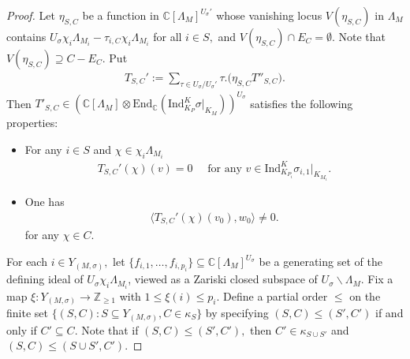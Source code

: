 \documentclass[10pt]{amsart}
\theoremstyle{definition}
\numberwithin{equation}{section}
\numberwithin{equation}{subsection}
\newcommand{\Ind}{\mathrm{Ind}}
\newcommand{\ZZ}{\mathbb{Z}}
\newcommand{\CC}{\mathbb{C}}
\begin{document}
\begin{proof}
Let $\eta_{S,C}$ be a function in $\CC[\Lambda_M]^{U_\sigma'}$ whose vanishing locus $V(\eta_{S,C})$ in $\Lambda_M$ contains $U_\sigma \chi_i\Lambda_{M_i}-\tau_{i,C}\chi_i\Lambda_{M_i}$ for all $i\in S,$ and $V(\eta_{S,C})\cap E_C=\emptyset.$ Note that $V(\eta_{S,C})\supseteq C-E_C.$ Put
\begin{align*}
    T_{S,C}':=\sum_{\tau\in U_\sigma/U_{\sigma}'} \tau. \bigg(\eta_{S,C} T''_{S,C}\bigg).
\end{align*}
Then $T'_{S,C}\in \left(\CC[\Lambda_M]\otimes \mathrm{End}_\CC (\Ind_{K_P}^K \sigma|_{K_M})\right)^{U_\sigma}$ satisfies the following properties: 
\begin{itemize}
    \item For any $i\in S$ and $\chi\in \chi_i\Lambda_{M_i}$
\begin{align*}
    T_{S,C}'(\chi)(v)=0\quad\textrm{ for any } v\in \mathrm{Ind}_{K_{P_i}}^{K} \sigma_{i,1}|_{K_{M_i}}.
\end{align*}
    \item One has 
    \begin{align*}
        \langle T_{S,C}'(\chi)(v_0),w_0\rangle\neq 0.
    \end{align*}
    for any $\chi\in C$.
\end{itemize}


 

For each $i\in Y_{(M,\sigma)},$ let $\{f_{i,1},\ldots,f_{i,p_i}\}\subseteq\CC[\Lambda_M]^{U_\sigma}$ be a generating set of the defining ideal of $U_\sigma\chi_i\Lambda_{M_i}$, viewed as a Zariski closed subspace of $U_\sigma\backslash \Lambda_M$. Fix a map $\xi:Y_{(M,\sigma)}\to \ZZ_{\geq 1}$ with $1\leq \xi(i)\leq p_i$. Define a partial order $\le$ on the finite set $\{(S,C): S\subseteq Y_{(M,\sigma)}, C\in \kappa_S\}$ by specifying $(S,C)\le (S',C')$ if and only if $C'\subseteq C$. Note that if $(S,C)\le (S',C'),$ then $C'\in \kappa_{S\cup S'}$ and $(S,C)\le (S\cup S', C').$ 
    

\end{proof}
\end{document}
